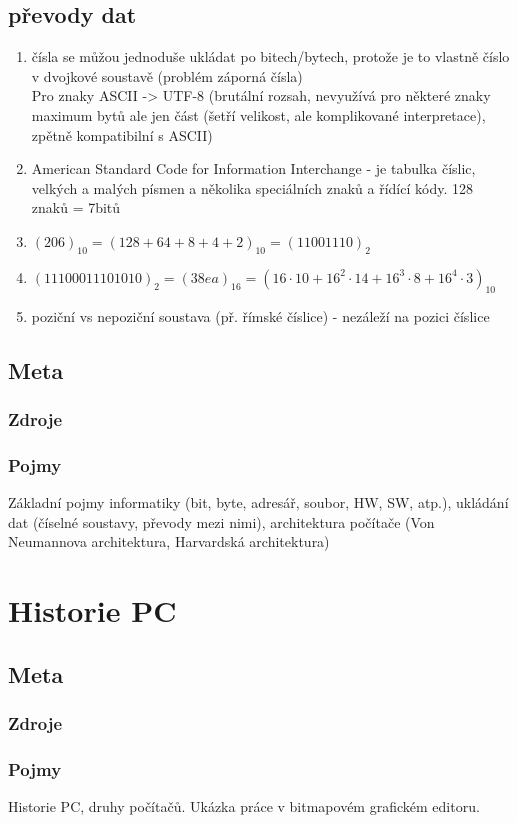 \documentclass[12pt]{article}
\begin{document}
\subsection{převody dat}
\begin{enumerate}
\item čísla se můžou jednoduše ukládat po bitech/bytech, protože je to vlastně číslo v dvojkové soustavě (problém záporná čísla)\\
Pro znaky ASCII -> UTF-8 (brutální rozsah, nevyužívá pro některé znaky maximum bytů ale jen část (šetří velikost, ale komplikované interpretace), zpětně kompatibilní s ASCII)
\item American Standard Code for Information Interchange - je tabulka číslic, velkých a malých písmen a několika speciálních znaků a řídící kódy. 128 znaků = 7bitů
\item $(206)_10 = (128 + 64 + 8 + 4 +2)_10 = (11001110)_2$
\item $(11100011101010)_2 = (38ea)_16 = (16 \cdot 10 + 16^2 \cdot 14 + 16^3 \cdot 8 + 16^4 \cdot 3)_10$
\item poziční vs nepoziční soustava (př. římské číslice) - nezáleží na pozici číslice
\end{enumerate}
\subsection{Meta}
\subsubsection{Zdroje}
\subsubsection{Pojmy}
Základní pojmy informatiky (bit, byte, adresář, soubor, HW, SW, atp.), ukládání dat (číselné soustavy, převody mezi nimi), architektura počítače (Von Neumannova architektura, Harvardská architektura)

\section{Historie PC}
\subsection{Meta}
\subsubsection{Zdroje}
\subsubsection{Pojmy}
Historie PC, druhy počítačů. Ukázka práce v bitmapovém grafickém editoru.
\end{document}
